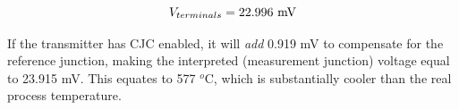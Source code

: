 $$V_{terminals} = 22.996 \hbox{ mV}$$

If the transmitter has CJC enabled, it will {\it add} 0.919 mV to compensate for the reference junction, making the interpreted (measurement junction) voltage equal to 23.915 mV.  This equates to 577 $^{o}$C, which is substantially cooler than the real process temperature.










